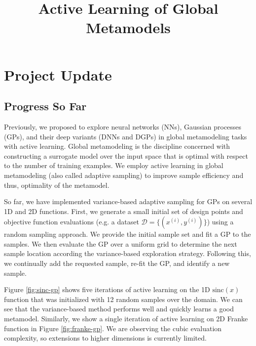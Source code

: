 \documentclass[conference]{IEEEtran}
\begin{document}
\title{\LARGE \textbf{Active Learning of Global Metamodels} 
}


\author{
} %


\maketitle

\section{Project Update}
\label{sec:update}

\subsection{Progress So Far}
Previously, we proposed to explore neural networks (NNs), Gaussian processes (GPs), and their deep variants (DNNs and DGPs) in global metamodeling tasks with active learning. Global metamodeling is the discipline concerned with constructing a surrogate model over the input space that is optimal with respect to the number of training examples. We employ active learning in global metamodeling (also called adaptive sampling) to improve sample efficiency and thus, optimality of the metamodel.

So far, we have implemented variance-based adaptive sampling for GPs on several 1D and 2D functions. First, we generate a small initial set of design points and objective function evaluations (e.g. a dataset $\mathcal{D} = \{(x^{(i)}, y^{(i)})\}$) using a random sampling approach. We provide the initial sample set and fit a GP to the samples. We then evaluate the GP over a uniform grid to determine the next sample location according the variance-based exploration strategy. Following this, we continually add the requested sample, re-fit the GP, and identify a new sample.

Figure \ref{fig:sinc-gp} shows five iterations of active learning on the 1D $\text{sinc}(x)$ function that was initialized with 12 random samples over the domain. We can see that the variance-based method performs well and quickly learns a good metamodel. Similarly, we show a single iteration of active learning on 2D Franke function in Figure \ref{fig:franke-gp}. We are observing the cubic evaluation complexity, so extensions to higher dimensions is currently limited.
\end{document}
